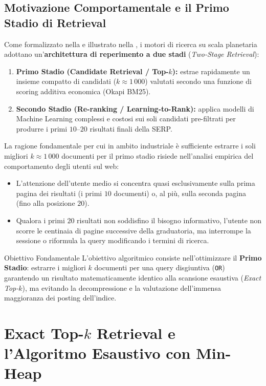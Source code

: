 \FloatBarrier
\subsection{Motivazione Comportamentale e il Primo Stadio di Retrieval}
Come formalizzato nella  e illustrato nella , i motori di ricerca su scala planetaria adottano un'\textbf{architettura di reperimento a due stadi} (\textit{Two-Stage Retrieval}):
\begin{enumerate}
    \item \textbf{Primo Stadio (Candidate Retrieval / Top-$k$):} estrae rapidamente un insieme compatto di candidati ($k \approx 1\,000$) valutati secondo una funzione di scoring additiva economica (Okapi BM25).
    \item \textbf{Secondo Stadio (Re-ranking / Learning-to-Rank):} applica modelli di Machine Learning complessi e costosi sui soli candidati pre-filtrati per produrre i primi $10\text{--}20$ risultati finali della SERP.
\end{enumerate}

La ragione fondamentale per cui in ambito industriale \`e sufficiente estrarre i soli migliori $k \approx 1\,000$ documenti per il primo stadio risiede nell'analisi empirica del comportamento degli utenti sul web:
\begin{itemize}
    \item L'attenzione dell'utente medio si concentra quasi esclusivamente sulla prima pagina dei risultati (i primi $10$ documenti) o, al pi\`u, sulla seconda pagina (fino alla posizione $20$).
    \item Qualora i primi $20$ risultati non soddisfino il bisogno informativo, l'utente non scorre le centinaia di pagine successive della graduatoria, ma interrompe la sessione o riformula la query modificando i termini di ricerca.
\end{itemize}

\begin{alertblock}{Obiettivo Fondamentale}
L'obiettivo algoritmico consiste nell'ottimizzare il \textbf{Primo Stadio}: estrarre i migliori $k$ documenti per una query disgiuntiva (\texttt{OR}) garantendo un risultato matematicamente identico alla scansione esaustiva (\textit{Exact Top-$k$}), ma evitando la decompressione e la valutazione dell'immensa maggioranza dei posting dell'indice.
\end{alertblock}

\FloatBarrier
\section{Exact Top-$k$ Retrieval e l'Algoritmo Esaustivo con Min-Heap}
\label{sec:exact-topk-minheap}

